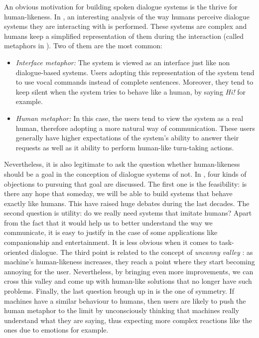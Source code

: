 	An obvious motivation for building spoken dialogue systems is the thrive for human-likeness. In \cite{Edlund2008}, an interesting analysis of the way humans perceive dialogue systems they are interacting with is performed. These systems are complex and humans keep a simplified representation of them during the interaction (called metaphors in \cite{Edlund2008}). Two of them are the most common:
	
	\begin{itemize}
		\item \textit{Interface metaphor:} The system is viewed as an interface just like non dialogue-based systems. Users adopting this representation of the system tend to use vocal commands instead of complete sentences. Moreover, they tend to keep silent when the system tries to behave like a human, by saying \textit{Hi!} for example.
		\item \textit{Human metaphor:} In this case, the users tend to view the system as a real human, therefore adopting a more natural way of communication. These users generally have higher expectations of the system's ability to answer their requests as well as it ability to perform human-like turn-taking actions.
	\end{itemize}
	
	Nevertheless, it is also legitimate to ask the question whether human-likeness should be a goal in the conception of dialogue systems of not. In \cite{Edlund2008}, four kinds of objections to pursuing that goal are discussed. The first one is the feasibility: is there any hope that someday, we will be able to build systems that behave exactly like humans. This have raised huge debates during the last decades. The second question is utility: do we really need systems that imitate humans? Apart from the fact that it would help us to better understand the way we communicate, it is easy to justify in the case of some applications like companionship and entertainment. It is less obvious when it comes to task-oriented dialogue. The third point is related to the concept of \textit{uncanny valley} \cite{Mori1970}: as machine's human-likeness increases, they reach a point where they start becoming annoying for the user. Nevertheless, by bringing even more improvements, we can cross this valley and come up with human-like solutions that no longer have such problems. Finally, the last question brough up in \cite{Edlund2008} is the one of symmetry. If machines have a similar behaviour to humans, then users are likely to push the human metaphor to the limit by unconsciously thinking that machines really understand what they are saying, thus expecting more complex reactions like the ones due to emotions for example.

